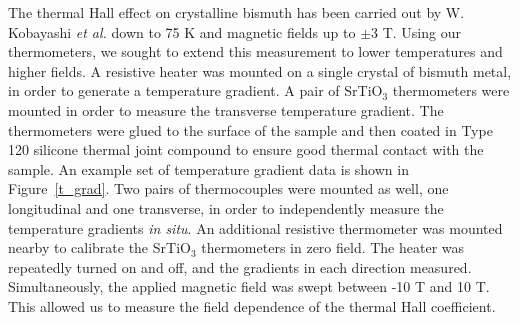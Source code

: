 \documentclass{thesis-umich}
\begin{document}

The thermal Hall effect on crystalline bismuth has been carried out by W.
Kobayashi \textit{et al.}\cite{Kobayashi2012} down to 75 K and magnetic fields up
to $\pm$3 T. Using our thermometers, we sought to extend this measurement to
lower temperatures and higher fields. A resistive heater was mounted on a single
crystal of bismuth metal, in order to generate a temperature gradient. A pair of
SrTiO$_3$ thermometers were mounted in order to measure the transverse
temperature gradient. The thermometers were glued to the surface of the sample
and then coated in Type 120 silicone thermal joint compound to ensure good
thermal contact with the sample. An example set of temperature gradient data is
shown in Figure~\ref{t_grad}. Two pairs of thermocouples were mounted as well,
one longitudinal and one transverse, in order to independently measure the
temperature gradients \textit{in situ}. An additional resistive thermometer was
mounted nearby to calibrate the SrTiO$_3$ thermometers in zero field.  The
heater was repeatedly turned on and off, and the gradients in each direction
measured. Simultaneously, the applied magnetic field was swept between -10 T and
10 T. This allowed us to measure the field dependence of the thermal Hall
coefficient.
\end{document}
